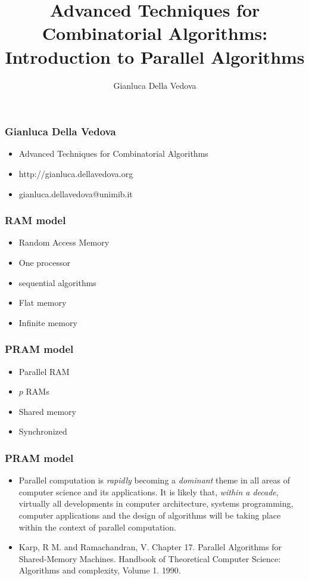 \documentclass[14pt]{beamer}
\author{Gianluca Della Vedova}
\title{Advanced Techniques for Combinatorial Algorithms:
Introduction to Parallel Algorithms}
\institute{Univ. Milano--Bicocca\\
  \texttt{http://gianluca.dellavedova.org}}
\date{{\tiny \vcsDate \vcsShortHash}}
\begin{document}
\begin{frame}
  \titlepage
\end{frame}


\begin{frame}\frametitle{Gianluca Della Vedova}
  \begin{itemize}
  \item
                Advanced Techniques for Combinatorial Algorithms
  \item
                \textsf{\small http://gianluca.dellavedova.org}
  \item
                \textsf{\small gianluca.dellavedova@unimib.it}
  \end{itemize}
\end{frame}



\begin{frame}\frametitle{RAM model}
  \begin{itemize}
  \item
    Random Access Memory
  \item
    One processor
  \item
    sequential algorithms
  \item
    Flat memory
  \item
    Infinite memory
  \end{itemize}
\end{frame}

\begin{frame}\frametitle{PRAM model}
  \begin{itemize}
  \item
    \alert{Parallel} RAM
  \item
    $p$ RAMs
  \item
    Shared memory
  \item
    Synchronized
  \end{itemize}
\end{frame}

\begin{frame}\frametitle{PRAM model}
  \begin{itemize}
  \item
Parallel computation is \emph{rapidly} becoming a \emph{dominant} theme in all areas of
computer science and its applications.
It is likely that, \emph{within a decade}, virtually all developments in computer
architecture, systems programming, computer applications and the design of
algorithms will be taking place within the context of parallel computation.
\item
\small  Karp, R M. and Ramachandran, V. Chapter 17. Parallel Algorithms for
  Shared-Memory Machines. Handbook of Theoretical Computer Science: Algorithms and complexity, Volume 1.
 \alert{1990}.
\end{itemize}
\end{frame}
\end{document}
